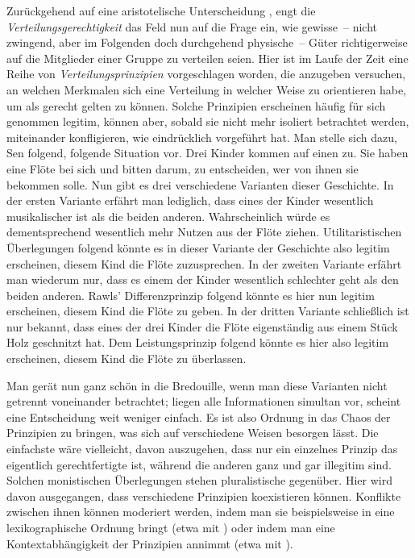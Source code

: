 \documentclass[justified,nobib,symmetric,twoside]{tufte-handout}
\begin{document}
Zurückgehend auf eine aristotelische Unterscheidung \citep{aristoteles_nikomachische_2006}, engt die \textit{Verteilungsgerechtigkeit} das Feld nun auf die Frage ein, wie gewisse~-- nicht zwingend, aber im Folgenden doch durchgehend physische~-- Güter richtigerweise auf die Mitglieder einer Gruppe zu verteilen seien.
Hier ist im Laufe der Zeit eine Reihe von \textit{Verteilungsprinzipien} vorgeschlagen worden, die anzugeben versuchen, an welchen Merkmalen sich eine Verteilung in welcher Weise zu orientieren habe, um als gerecht gelten zu können.
Solche Prinzipien erscheinen häufig für sich genommen legitim, können aber, sobald sie nicht mehr isoliert betrachtet werden, miteinander konfligieren, wie \citet[S.~290f.]{sen_resources_1984} eindrücklich vorgeführt hat.
Man stelle sich dazu, Sen folgend, folgende Situation vor.
Drei Kinder kommen auf einen zu.
Sie haben eine Flöte bei sich und bitten darum, zu entscheiden, wer von ihnen sie bekommen solle.
Nun gibt es drei verschiedene Varianten dieser Geschichte.
In der ersten Variante erfährt man lediglich, dass eines der Kinder wesentlich musikalischer ist als die beiden anderen.
Wahrscheinlich würde es dementsprechend wesentlich mehr Nutzen aus der Flöte ziehen.
Utilitaristischen Überlegungen folgend könnte es in dieser Variante der Geschichte also legitim erscheinen, diesem Kind die Flöte zuzusprechen.
In der zweiten Variante erfährt man wiederum nur, dass es einem der Kinder wesentlich schlechter geht als den beiden anderen.
Rawls' Differenzprinzip folgend könnte es hier nun legitim erscheinen, diesem Kind die Flöte zu geben.
In der dritten Variante schließlich ist nur bekannt, dass eines der drei Kinder die Flöte eigenständig aus einem Stück Holz geschnitzt hat.
Dem Leistungsprinzip folgend könnte es hier also legitim erscheinen, diesem Kind die Flöte zu überlassen.

Man gerät nun ganz schön in die Bredouille, wenn man diese Varianten nicht getrennt voneinander betrachtet; liegen alle Informationen simultan vor, scheint eine Entscheidung weit weniger einfach.
Es ist also Ordnung in das Chaos der Prinzipien zu bringen, was sich auf verschiedene Weisen besorgen lässt.
Die einfachste wäre vielleicht, davon auszugehen, dass nur ein einzelnes Prinzip das eigentlich gerechtfertigte ist, während die anderen ganz und gar illegitim sind.
Solchen monistischen Überlegungen stehen pluralistische gegenüber.
Hier wird davon ausgegangen, dass verschiedene Prinzipien koexistieren können.
Konflikte zwischen ihnen können moderiert werden, indem man sie beispielsweise in eine lexikographische Ordnung bringt (etwa mit \cite{rawls_theory_1971}) oder indem man eine Kontextabhängigkeit der Prinzipien annimmt (etwa mit \cite{walzer_spheres_1983}).
\end{document}
